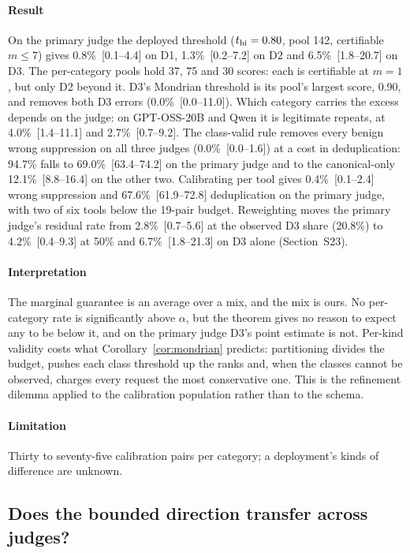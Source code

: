 \paragraph{Result} On the primary judge the deployed threshold ($t_{\mathrm{hi}}=0.80$, pool 142, certifiable $m\le7$) gives 0.8\%~[0.1--4.4] on D1, 1.3\%~[0.2--7.2] on D2 and 6.5\%~[1.8--20.7] on D3. The per-category pools hold 37, 75 and 30 scores: each is certifiable at $m=1$, but only D2 beyond it. D3's Mondrian threshold is its pool's largest score, 0.90, and removes both D3 errors (0.0\%~[0.0--11.0]). Which category carries the excess depends on the judge: on GPT-OSS-20B and Qwen it is legitimate repeats, at 4.0\%~[1.4--11.1] and 2.7\%~[0.7--9.2]. The class-valid rule removes every benign wrong suppression on all three judges (0.0\%~[0.0--1.6]) at a cost in deduplication: 94.7\% falls to 69.0\%~[63.4--74.2] on the primary judge and to the canonical-only 12.1\%~[8.8--16.4] on the other two. Calibrating per tool gives 0.4\%~[0.1--2.4] wrong suppression and 67.6\%~[61.9--72.8] deduplication on the primary judge, with two of six tools below the 19-pair budget. Reweighting moves the primary judge's residual rate from 2.8\%~[0.7--5.6] at the observed D3 share (20.8\%) to 4.2\%~[0.4--9.3] at 50\% and 6.7\%~[1.8--21.3] on D3 alone (Section~S23).

\paragraph{Interpretation} The marginal guarantee is an average over a mix, and the mix is ours. No per-category rate is significantly above $\alpha$, but the theorem gives no reason to expect any to be below it, and on the primary judge D3's point estimate is not. Per-kind validity costs what Corollary~\ref{cor:mondrian} predicts: partitioning divides the budget, pushes each class threshold up the ranks and, when the classes cannot be observed, charges every request the most conservative one. This is the refinement dilemma applied to the calibration population rather than to the schema.

\paragraph{Limitation} Thirty to seventy-five calibration pairs per category; a deployment's kinds of difference are unknown.

\subsection{Does the bounded direction transfer across judges?}\label{sec:res-judges}

